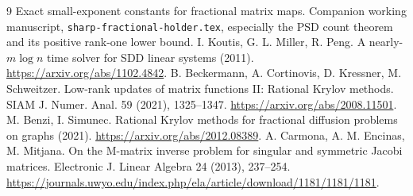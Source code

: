 \documentclass[11pt]{article}
\begin{document}
\begin{thebibliography}{9}
 Exact small-exponent constants for fractional matrix maps.
Companion working manuscript, \texttt{sharp-fractional-holder.tex},
especially the PSD count theorem and its positive rank-one lower bound.
 I. Koutis, G. L. Miller, R. Peng.
A nearly-$m\log n$ time solver for SDD linear systems (2011).
\url{https://arxiv.org/abs/1102.4842}.
 B. Beckermann, A. Cortinovis, D. Kressner, M. Schweitzer.
Low-rank updates of matrix functions II: Rational Krylov methods.
SIAM J. Numer. Anal. 59 (2021), 1325--1347.
\url{https://arxiv.org/abs/2008.11501}.
 M. Benzi, I. Simunec.
Rational Krylov methods for fractional diffusion problems on graphs (2021).
\url{https://arxiv.org/abs/2012.08389}.
 A. Carmona, A. M. Encinas, M. Mitjana.
On the M-matrix inverse problem for singular and symmetric Jacobi matrices.
Electronic J. Linear Algebra 24 (2013), 237--254.
\url{https://journals.uwyo.edu/index.php/ela/article/download/1181/1181/1181}.
\end{thebibliography}
\end{document}
